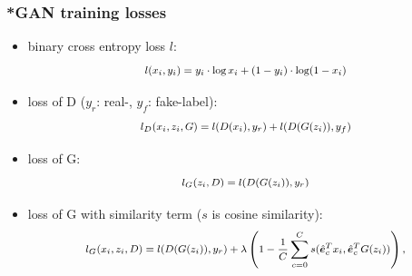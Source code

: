 \begin{frame}
  \frametitle{*GAN training losses}
  \begin{itemize}
    \item binary cross entropy loss $l$:
    \begin{equation*}
      \footnotesize
      \begin{aligned}
        l(x_i, y_i) = y_i \cdot \log x_i + (1 - y_i) \cdot \log (1 - x_i)
      \end{aligned}
    \end{equation*}
    \item loss of D ($y_r$: real-, $y_f$: fake-label):
    \begin{equation*}
      \footnotesize
      \begin{aligned}
        l_D(x_i, z_i, G) = l(D(x_i), y_r) + l(D(G(z_i)), y_f)
      \end{aligned}
    \end{equation*}
    \item loss of G:
    \begin{equation*}
      \footnotesize
      \begin{aligned}
        l_G(z_i, D) =  l(D(G(z_i)), y_r)
      \end{aligned}
    \end{equation*}
    \item loss of G with similarity term ($s$ is cosine similarity):
    \begin{equation*}
      \footnotesize
      \begin{aligned}
        l_G(x_i, z_i, D) =  l(D(G(z_i)), y_r) + \lambda \left(1 - \frac{1}{C} \sum_{c=0}^{C} s(\hat{\bm{e}}_c^T x_i , \hat{\bm{e}}_c^T G(z_i)) \right),
      \end{aligned}
    \end{equation*}
  \end{itemize}
\end{frame}

